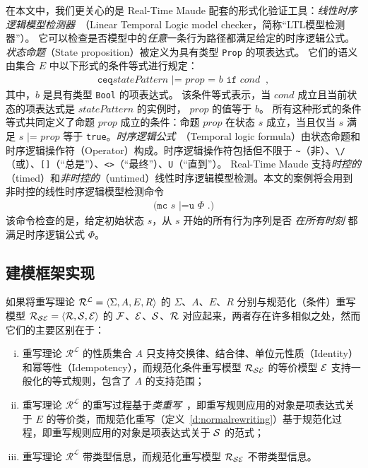 在本文中，我们更关心的是 Real-Time Maude 配套的形式化验证工具：\emph{线性时序逻辑模型检测器}~\cite{DBLP:journals/entcs/EkerMS02}（Linear Temporal Logic model checker，简称“LTL模型检测器”）。
它可以检查是否模型中的\emph{任意}一条行为路径都满足给定的时序逻辑公式。
\emph{状态命题}（State proposition）被定义为具有类型 \verb|Prop| 的项表达式。
它们的语义由集合 $\mathit{E}$ 中以下形式的条件等式进行规定：
\begin{eqnarray}
\texttt{ceq
} \mathit{statePattern} \texttt{ |= } \mathit{prop} \texttt{ = } b
\texttt{ if } cond\;\; , \nonumber
\end{eqnarray}
其中，$b$ 是具有类型 \verb|Bool| 的项表达式。
该条件等式表示，当 $cond$ 成立且当前状态的项表达式是 $\mathit{statePattern}$ 的实例时， $\mathit{prop}$ 的值等于 $b$。
所有这种形式的条件等式共同定义了命题 $\mathit{prop}$ 成立的条件：命题 $\mathit{prop}$ 在状态 $s$ 成立，当且仅当 $s$ 满足 $s \texttt{ |= } \mathit{prop}$ 等于 \verb|true|。\emph{时序逻辑公式}~\cite{DBLP:books/daglib/0077033}（Temporal logic formula）由状态命题和时序逻辑操作符（Operator）构成。时序逻辑操作符包括但不限于 \verb|~|（非）、\verb|\/|（或）、\verb|[]|（“总是”）、\verb|<>|（“最终”）、\verb|U|（“直到”）。 Real-Time Maude 支持\emph{时控的}（timed）和\emph{非时控的}（untimed）线性时序逻辑模型检测。本文的案例将会用到非时控的线性时序逻辑模型检测命令
\begin{eqnarray}
  \texttt{(mc } s \texttt{ |=u } \Phi \texttt{ .)} \nonumber
\end{eqnarray}
该命令检查的是，给定初始状态 $s$，从 $s$ 开始的所有行为序列是否 \emph{在所有时刻} 都满足时序逻辑公式 $\Phi$。


\subsection{建模框架实现} 
\label{ss:method-impl}

如果将重写理论 $\mathcal{R^L} = \langle \Sigma, A, E, R\rangle$ 的 $\Sigma$、$A$、$E$、$R$ 分别与规范化（条件）重写模型 $\mathcal{R}_{\mathcal{S}\mathcal{E}} = \langle \mathcal{R},\mathcal{S},\mathcal{E}\rangle$ 的 $\mathcal{F}$、$\mathcal{E}$、$\mathcal{S}$、$\mathcal{R}$ 对应起来，两者存在许多相似之处，然而它们的主要区别在于：
\begin{enumerate}[(i)]
\item 重写理论 $\mathcal{R^L}$ 的性质集合 $A$ 只支持交换律、结合律、单位元性质（Identity）和幂等性（Idempotency），而规范化条件重写模型 $\mathcal{R}_{\mathcal{S}\mathcal{E}}$ 的等价模型 $\mathcal{E}$ 支持一般化的等式规则，包含了 $A$ 的支持范围；
\item 重写理论 $\mathcal{R^L}$ 的重写过程基于\emph{类重写}~\cite{lankford77b}，即重写规则应用的对象是项表达式关于 $E$ 的等价类，而规范化重写（定义~\ref{d:normalrewriting}）基于规范化过程，即重写规则应用的对象是项表达式关于 $\mathcal{S}$ 的范式；
\item 重写理论 $\mathcal{R^L}$ 带类型信息，而规范化重写模型 $\mathcal{R}_{\mathcal{S}\mathcal{E}}$ 不带类型信息。
\end{enumerate}

